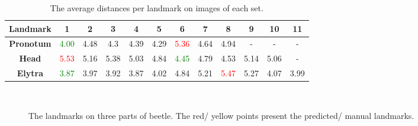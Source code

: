 \documentclass[review]{elsarticle}
\begin{document}
\begin{table}[h!]
	\centering	
	\begin{tabular}{|c|c|c|c|c|c|c|c|c|c|c|c|}
		\hline
		\textbf{Landmark} & 1 & 2 & 3 & 4 & 5 & 6 & 7 & 8 & 9 & 10 & 11 \\ \hline
		\textbf{Pronotum} & \textcolor{green}{4.00} & 4.48 & 4.3 & 4.39 & 4.29 & \textcolor{red}{5.36} & 4.64 & 4.94 & - & - & - \\ \hline
		\textbf{Head} & \textcolor{red}{5.53} & 5.16 & 5.38 & 5.03 & 4.84 & \textcolor{green}{4.45} & 4.79 & 4.53 & 5.14 & 5.06 & - \\ \hline
		\textbf{Elytra} & \textcolor{green}{3.87} & 3.97 & 3.92 & 3.87 & 4.02 & 4.84 & 5.21 & \textcolor{red}{5.47} & 5.27 & 4.07 & 3.99 \\ \hline
	\end{tabular}
	\caption{The average distances per landmark on images of each set.}
	\label{tblavgpronotum}
\end{table}

\begin{figure}[h!]
	\centering
    ~~
	~~
    \caption{The landmarks on three parts of beetle. The red/ yellow points present the predicted/ manual landmarks.}
    \label{figeb1}
\end{figure}
\end{document}
